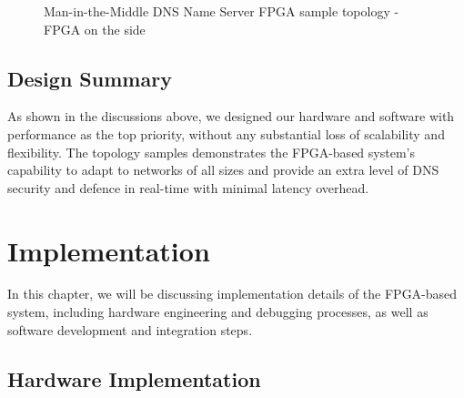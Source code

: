 \documentclass[a4paper]{report}
\begin{document}
\begin{figure}[H]
  \caption{Man-in-the-Middle DNS Name Server FPGA sample topology - FPGA on the side}
  \label{fig:dns-flood-man-in-the-middle-asic}
\end{figure}

\section{Design Summary}

As shown in the discussions above, we designed our hardware and software with performance as the top priority, without any substantial loss of scalability and flexibility. The topology samples demonstrates the FPGA-based system's capability to adapt to networks of all sizes and provide an extra level of DNS security and defence in real-time with minimal latency overhead.

\chapter{Implementation}

In this chapter, we will be discussing implementation details of the FPGA-based system, including hardware engineering and debugging processes, as well as software development and integration steps.

\section{Hardware Implementation}
\label{section:implementation-hardware-implementation}
\end{document}
